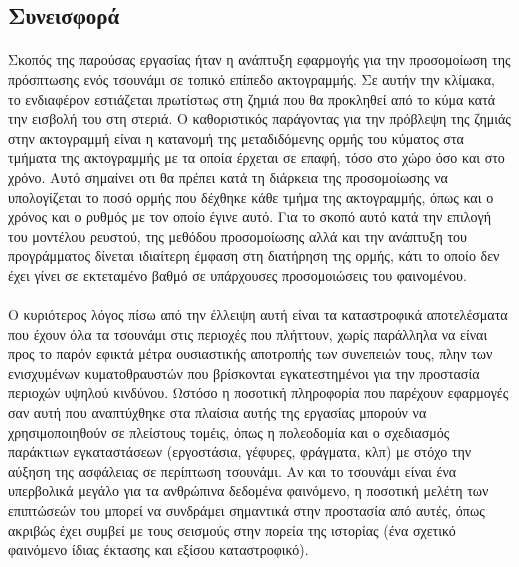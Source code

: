 \subsection{Συνεισφορά}
\paragraph{} Σκοπός της παρούσας εργασίας ήταν η ανάπτυξη εφαρμογής για την προσομοίωση
της πρόσπτωσης ενός τσουνάμι σε τοπικό επίπεδο ακτογραμμής. Σε αυτήν την κλίμακα, το
ενδιαφέρον εστιάζεται πρωτίστως στη ζημιά που θα προκληθεί από το κύμα κατά την εισβολή
του στη στεριά. Ο καθοριστικός παράγοντας για την πρόβλεψη της ζημιάς στην ακτογραμμή
είναι η κατανομή της μεταδιδόμενης ορμής του κύματος στα τμήματα της ακτογραμμής με τα
οποία έρχεται σε επαφή, τόσο στο χώρο όσο και στο χρόνο. Αυτό σημαίνει οτι θα πρέπει κατά
τη διάρκεια της προσομοίωσης να υπολογίζεται το ποσό ορμής που δέχθηκε κάθε τμήμα της
ακτογραμμής, όπως και ο χρόνος και ο ρυθμός με τον οποίο έγινε αυτό. Για το σκοπό αυτό
κατά την επιλογή του μοντέλου ρευστού, της μεθόδου προσομοίωσης αλλά και την ανάπτυξη του
προγράμματος δίνεται ιδιαίτερη έμφαση στη διατήρηση της ορμής, κάτι το οποίο δεν έχει
γίνει σε εκτεταμένο βαθμό σε υπάρχουσες προσομοιώσεις του φαινομένου.

\paragraph{} Ο κυριότερος λόγος πίσω από την έλλειψη αυτή είναι τα καταστροφικά
αποτελέσματα που έχουν όλα τα τσουνάμι στις περιοχές που πλήττουν, χωρίς παράλληλα να
είναι προς το παρόν εφικτά μέτρα ουσιαστικής αποτροπής των συνεπειών τους, πλην των
ενισχυμένων κυματοθραυστών που βρίσκονται εγκατεστημένοι για την προστασία περιοχών υψηλού
κινδύνου. Ωστόσο η ποσοτική πληροφορία που παρέχουν εφαρμογές σαν αυτή που αναπτύχθηκε στα
πλαίσια αυτής της εργασίας μπορούν να χρησιμοποιηθούν σε πλείστους τομέις, όπως η
πολεοδομία και ο σχεδιασμός παράκτιων εγκαταστάσεων (εργοστάσια, γέφυρες, φράγματα, κλπ)
με στόχο την αύξηση της ασφάλειας σε περίπτωση τσουνάμι. Αν και το τσουνάμι είναι ένα
υπερβολικά μεγάλο για τα ανθρώπινα δεδομένα φαινόμενο, η ποσοτική μελέτη των επιπτώσεών
του μπορεί να συνδράμει σημαντικά στην προστασία από αυτές, όπως ακριβώς έχει συμβεί με
τους σεισμούς στην πορεία της ιστορίας (ένα σχετικό φαινόμενο ίδιας έκτασης και εξίσου
καταστροφικό).

